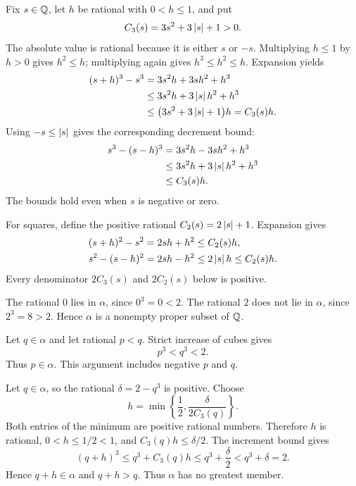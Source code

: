 Fix $s\in\mathbb{Q}$, let $h$ be rational with $0<h\le1$, and put
\[
 C_3(s)=3s^2+3\left|s\right|+1>0.
\]
The absolute value is rational because it is either $s$ or $-s$.
Multiplying $h\le1$ by $h>0$ gives $h^2\le h$; multiplying again
gives $h^3\le h^2\le h$. Expansion yields
\begin{align*}
 (s+h)^3-s^3
   &=3s^2h+3sh^2+h^3\\
   &\le3s^2h+3\left|s\right|h^2+h^3\\
   &\le\bigl(3s^2+3\left|s\right|+1\bigr)h=C_3(s)h.
\end{align*}
Using $-s\le\left|s\right|$ gives the corresponding decrement bound:
\begin{align*}
 s^3-(s-h)^3
   &=3s^2h-3sh^2+h^3\\
   &\le3s^2h+3\left|s\right|h^2+h^3\\
   &\le C_3(s)h.
\end{align*}
The bounds hold even when $s$ is negative or zero.

For squares, define the positive rational $C_2(s)=2\left|s\right|+1$.
Expansion gives
\begin{align*}
 (s+h)^2-s^2&=2sh+h^2\le C_2(s)h,\\
 s^2-(s-h)^2&=2sh-h^2\le2\left|s\right|h\le C_2(s)h.
\end{align*}
Every denominator $2C_3(s)$ and $2C_2(s)$ below is positive.

The rational $0$ lies in $\alpha$, since $0^3=0<2$.
The rational $2$ does not lie in $\alpha$, since $2^3=8>2$.
Hence $\alpha$ is a nonempty proper subset of $\mathbb{Q}$.

Let $q\in\alpha$ and let rational $p<q$.
Strict increase of cubes gives
\[
 p^3<q^3<2.
\]
Thus $p\in\alpha$. This argument includes negative $p$ and $q$.

Let $q\in\alpha$, so the rational $\delta=2-q^3$ is positive.
Choose
\[
 h=\min\left\{\frac12,\frac{\delta}{2C_3(q)}\right\}.
\]
Both entries of the minimum are positive rational numbers.
Therefore $h$ is rational, $0<h\le1/2<1$, and
$C_3(q)h\le\delta/2$. The increment bound gives
\[
 (q+h)^3\le q^3+C_3(q)h
          \le q^3+\frac\delta2
          <q^3+\delta=2.
\]
Hence $q+h\in\alpha$ and $q+h>q$. Thus $\alpha$ has no greatest member.


